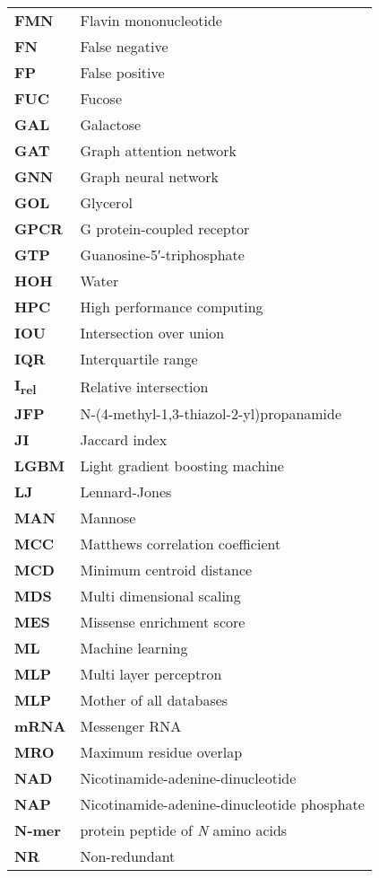 \begin{longtable}[l]{@{}p{2.5cm}p{12cm}@{}}
\textbf{FMN} & Flavin mononucleotide \\
\textbf{FN} & False negative \\
\textbf{FP} & False positive \\
\textbf{FUC} & Fucose \\
\textbf{GAL} & Galactose \\
\textbf{GAT} & Graph attention network \\
\textbf{GNN} & Graph neural network \\
\textbf{GOL} & Glycerol \\
\textbf{GPCR} & G protein-coupled receptor\\
\textbf{GTP} & Guanosine-5′-triphosphate \\
\textbf{HOH} & Water \\
\textbf{HPC} & High performance computing \\
\textbf{IOU} & Intersection over union \\
\textbf{IQR} & Interquartile range \\
\textbf{I\textsubscript{rel}} & Relative intersection \\
\textbf{JFP} & N-(4-methyl-1,3-thiazol-2-yl)propanamide \\
\textbf{JI} & Jaccard index \\
\textbf{LGBM} & Light gradient boosting machine \\
\textbf{LJ} & Lennard-Jones \\
\textbf{MAN} & Mannose \\
\textbf{MCC} & Matthews correlation coefficient \\
\textbf{MCD} & Minimum centroid distance \\
\textbf{MDS} & Multi dimensional scaling \\
\textbf{MES} & Missense enrichment score \\
\textbf{ML} & Machine learning \\
\textbf{MLP} & Multi layer perceptron \\
\textbf{MLP} & Mother of all databases \\
\textbf{mRNA} & Messenger RNA \\
\textbf{MRO} & Maximum residue overlap \\
\textbf{NAD} & Nicotinamide-adenine-dinucleotide \\
\textbf{NAP} & Nicotinamide-adenine-dinucleotide phosphate \\
\textbf{N-mer} & protein peptide of \textit{N} amino acids \\
\textbf{NR} & Non-redundant \\

\end{longtable}
